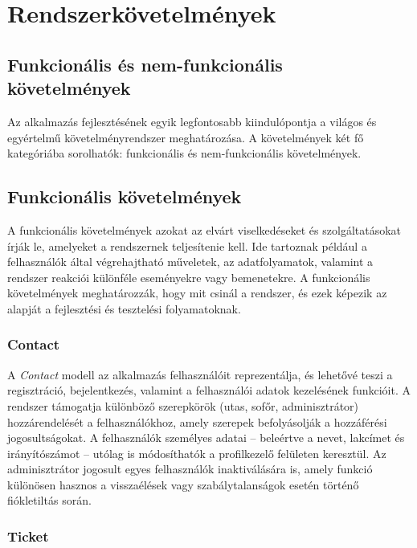 \section{Rendszerkövetelmények}

\subsection{Funkcionális és nem-funkcionális követelmények}

\indent Az alkalmazás fejlesztésének egyik legfontosabb kiindulópontja a világos és egyértelmű követelményrendszer meghatározása. A követelmények két fő kategóriába sorolhatók: funkcionális és nem-funkcionális követelmények. 

\subsection{Funkcionális követelmények}

A funkcionális követelmények azokat az elvárt viselkedéseket és szolgáltatásokat írják le, amelyeket a rendszernek teljesítenie kell. Ide tartoznak például a felhasználók által végrehajtható műveletek, az adatfolyamatok, valamint a rendszer reakciói különféle eseményekre vagy bemenetekre. A funkcionális követelmények meghatározzák, hogy mit csinál a rendszer, és ezek képezik az alapját a fejlesztési és tesztelési folyamatoknak.


\subsubsection{Contact}

A \textit{Contact} modell az alkalmazás felhasználóit reprezentálja, és lehetővé teszi a regisztráció, bejelentkezés, valamint a felhasználói adatok kezelésének funkcióit. A rendszer támogatja különböző szerepkörök (utas, sofőr, adminisztrátor) hozzárendelését a felhasználókhoz, amely szerepek befolyásolják a hozzáférési jogosultságokat. A felhasználók személyes adatai – beleértve a nevet, lakcímet és irányítószámot – utólag is módosíthatók a profilkezelő felületen keresztül. Az adminisztrátor jogosult egyes felhasználók inaktiválására is, amely funkció különösen hasznos a visszaélések vagy szabálytalanságok esetén történő fiókletiltás során.



\subsubsection{Ticket}

